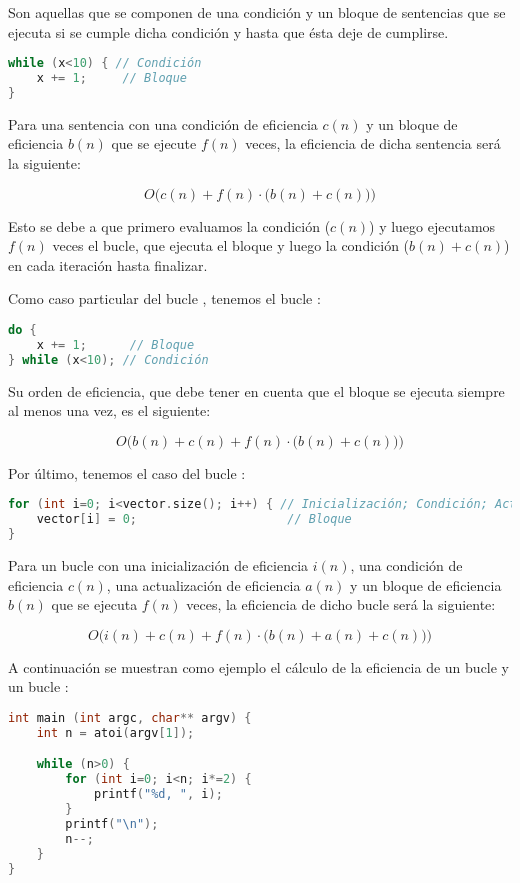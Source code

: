 Son aquellas que se componen de una condición y un bloque de sentencias que se ejecuta si se cumple dicha condición y hasta que ésta deje de cumplirse.

\begin{lstlisting}[language=C]
while (x<10) { // Condición
	x += 1;     // Bloque
}
\end{lstlisting}

Para una sentencia con una condición de eficiencia $c(n)$ y un bloque de eficiencia $b(n)$ que se ejecute $f(n)$ veces, la eficiencia de dicha sentencia será la siguiente:

\[O\Big(c(n)+f(n)\cdot\big(b(n)+c(n)\big)\Big)\]

Esto se debe a que primero evaluamos la condición ($c(n)$) y luego ejecutamos $f(n)$ veces el bucle, que ejecuta el bloque y luego la condición ($b(n)+c(n)$) en cada iteración hasta finalizar.

Como caso particular del bucle , tenemos el bucle :

\begin{lstlisting}[language=C]
do {
	x += 1;      // Bloque
} while (x<10); // Condición
\end{lstlisting}

Su orden de eficiencia, que debe tener en cuenta que el bloque se ejecuta siempre al menos una vez, es el siguiente:

\[O\Big(b(n)+c(n)+f(n)\cdot\big(b(n)+c(n)\big)\Big)\]

Por último, tenemos el caso del bucle :

\begin{lstlisting}[language=C]
for (int i=0; i<vector.size(); i++) { // Inicialización; Condición; Actualización
	vector[i] = 0;                     // Bloque
}
\end{lstlisting}

Para un bucle con una inicialización de eficiencia $i(n)$, una condición de eficiencia $c(n)$, una actualización de eficiencia $a(n)$ y un bloque de eficiencia $b(n)$ que se ejecuta $f(n)$ veces, la eficiencia de dicho bucle será la siguiente:

\[O\Big(i(n)+c(n)+f(n)\cdot\big(b(n)+a(n)+c(n)\big)\Big)\]

A continuación se muestran como ejemplo el cálculo de la eficiencia de un bucle  y un bucle :

\begin{lstlisting}[language=C]
int main (int argc, char** argv) {
	int n = atoi(argv[1]);

	while (n>0) {
		for (int i=0; i<n; i*=2) {
			printf("%d, ", i);
		}
		printf("\n");
		n--;
	}
}
\end{lstlisting}


